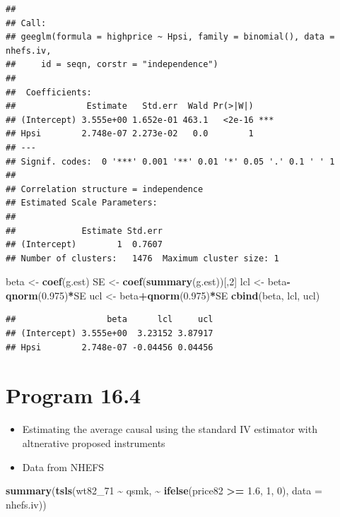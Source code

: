 \documentclass[
  10pt,
]{book}
\newenvironment{Shaded}{\begin{snugshade}}{\end{snugshade}}
\newcommand{\DataTypeTok}[1]{\textcolor[rgb]{0.13,0.29,0.53}{#1}}
\newcommand{\DecValTok}[1]{\textcolor[rgb]{0.00,0.00,0.81}{#1}}
\newcommand{\FloatTok}[1]{\textcolor[rgb]{0.00,0.00,0.81}{#1}}
\newcommand{\KeywordTok}[1]{\textcolor[rgb]{0.13,0.29,0.53}{\textbf{#1}}}
\newcommand{\NormalTok}[1]{#1}
\newcommand{\OperatorTok}[1]{\textcolor[rgb]{0.81,0.36,0.00}{\textbf{#1}}}
\newcommand{\StringTok}[1]{\textcolor[rgb]{0.31,0.60,0.02}{#1}}
\providecommand{\tightlist}{%
  \setlength{\itemsep}{0pt}\setlength{\parskip}{0pt}}
\begin{document}
\begin{verbatim}
## 
## Call:
## geeglm(formula = highprice ~ Hpsi, family = binomial(), data = nhefs.iv, 
##     id = seqn, corstr = "independence")
## 
##  Coefficients:
##              Estimate   Std.err  Wald Pr(>|W|)    
## (Intercept) 3.555e+00 1.652e-01 463.1   <2e-16 ***
## Hpsi        2.748e-07 2.273e-02   0.0        1    
## ---
## Signif. codes:  0 '***' 0.001 '**' 0.01 '*' 0.05 '.' 0.1 ' ' 1
## 
## Correlation structure = independence 
## Estimated Scale Parameters:
## 
##             Estimate Std.err
## (Intercept)        1  0.7607
## Number of clusters:   1476  Maximum cluster size: 1
\end{verbatim}

\begin{Shaded}
\begin{Highlighting}[]
\NormalTok{beta \textless{}{-}}\StringTok{ }\KeywordTok{coef}\NormalTok{(g.est)}
\NormalTok{SE \textless{}{-}}\StringTok{ }\KeywordTok{coef}\NormalTok{(}\KeywordTok{summary}\NormalTok{(g.est))[,}\DecValTok{2}\NormalTok{]}
\NormalTok{lcl \textless{}{-}}\StringTok{ }\NormalTok{beta}\OperatorTok{{-}}\KeywordTok{qnorm}\NormalTok{(}\FloatTok{0.975}\NormalTok{)}\OperatorTok{*}\NormalTok{SE }
\NormalTok{ucl \textless{}{-}}\StringTok{ }\NormalTok{beta}\OperatorTok{+}\KeywordTok{qnorm}\NormalTok{(}\FloatTok{0.975}\NormalTok{)}\OperatorTok{*}\NormalTok{SE}
\KeywordTok{cbind}\NormalTok{(beta, lcl, ucl)}
\end{Highlighting}
\end{Shaded}

\begin{verbatim}
##                  beta      lcl     ucl
## (Intercept) 3.555e+00  3.23152 3.87917
## Hpsi        2.748e-07 -0.04456 0.04456
\end{verbatim}

\hypertarget{program-16.4}{%
\section{Program 16.4}\label{program-16.4}}

\begin{itemize}
\tightlist
\item
  Estimating the average causal using the standard IV estimator with altnerative proposed instruments
\item
  Data from NHEFS
\end{itemize}

\begin{Shaded}
\begin{Highlighting}[]
\KeywordTok{summary}\NormalTok{(}\KeywordTok{tsls}\NormalTok{(wt82\_}\DecValTok{71} \OperatorTok{\textasciitilde{}}\StringTok{ }\NormalTok{qsmk, }\OperatorTok{\textasciitilde{}}\StringTok{ }\KeywordTok{ifelse}\NormalTok{(price82 }\OperatorTok{\textgreater{}=}\StringTok{ }\FloatTok{1.6}\NormalTok{, }\DecValTok{1}\NormalTok{, }\DecValTok{0}\NormalTok{), }\DataTypeTok{data =}\NormalTok{ nhefs.iv))}
\end{Highlighting}
\end{Shaded}
\end{document}
